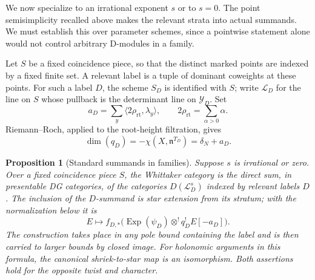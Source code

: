 \documentclass[11pt]{article}
\numberwithin{equation}{section}
\newtheorem{proposition}[theorem]{Proposition}
\theoremstyle{definition}
\theoremstyle{remark}
\begin{document}
We now specialize to an irrational exponent $s$ or to $s=0$. The point
semisimplicity recalled above makes the relevant strata into actual
summands. We must establish this over parameter schemes, since a
pointwise statement alone would not control arbitrary D-modules in a
family.

Let $S$ be a fixed coincidence piece, so that the distinct marked points
are indexed by a fixed finite set. A relevant label is a tuple of
dominant coweights at these points. For such a label $D$, the scheme
$S_D$ is identified with $S$; write $\mathcal L_D$ for the line on $S$
whose pullback is the determinant line on $\mathcal Y_D$. Set
\[
 a_D=\sum_y\langle 2\rho_{\mathrm{rt}},\lambda_y\rangle,
 \qquad 2\rho_{\mathrm{rt}}=\sum_{\alpha>0}\alpha.
\]
Riemann--Roch, applied to the root-height filtration, gives
\begin{equation}\label{whittaker:stratum-dimension}
 \dim(q_D)=-\chi(X,\mathfrak n^{T_D})=\delta_N+a_D.
\end{equation}

\begin{proposition}[Standard summands in families]
\label{whittaker:standards}
Suppose $s$ is irrational or zero. Over a fixed coincidence piece $S$,
the Whittaker category is the direct sum, in presentable DG categories,
of the categories $D(\mathcal L_D^s)$ indexed by relevant labels $D$.
The inclusion of the $D$-summand is star extension from its stratum;
with the normalization below it is
\begin{equation}\label{eq:W3}
 E\longmapsto
 f_{D,*}\bigl(\operatorname{Exp}(\psi_D)\otimes^!q_D^!E[-a_D]\bigr).
\end{equation}
The construction takes place in any pole bound containing the label and
is then carried to larger bounds by closed image. For holonomic
arguments in this formula, the canonical shriek-to-star map is an
isomorphism. Both assertions hold for the opposite twist and character.
\end{proposition}
\end{document}
